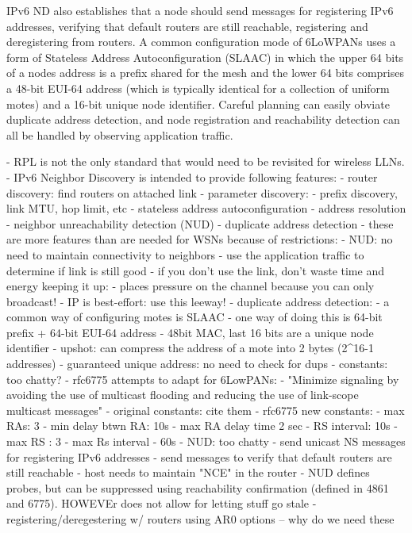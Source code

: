 IPv6 ND also establishes that a node should send messages for registering IPv6 addresses, verifying that default routers are still reachable, registering and deregistering from routers.
A common configuration mode of 6LoWPANs uses a form of Stateless Address Autoconfiguration (SLAAC) in which the upper 64 bits of a nodes address is a prefix shared for the mesh and the lower 64 bits comprises a 48-bit EUI-64 address (which is typically identical for a collection of uniform motes) and a 16-bit unique node identifier.
Careful planning can easily obviate duplicate address detection, and node registration and reachability detection can all be handled by observing application traffic.



- RPL is not the only standard that would need to be revisited for wireless LLNs.
- IPv6 Neighbor Discovery is intended to provide following features:
    - router discovery: find routers on attached link
    - parameter discovery:
        - prefix discovery, link MTU, hop limit, etc
    - stateless address autoconfiguration
    - address resolution
    - neighbor unreachability detection (NUD)
    - duplicate address detection
- these are more features than are needed for WSNs because of restrictions:
    - NUD: no need to maintain connectivity to neighbors
        - use the application traffic to determine if link is still good
        - if you don't use the link, don't waste time and energy keeping it up:
            - places pressure on the channel because you can only broadcast!
        - IP is best-effort: use this leeway!
    - duplicate address detection:
        - a common way of configuring motes is SLAAC
        - one way of doing this is 64-bit prefix + 64-bit EUI-64 address
        - 48bit MAC, last 16 bits are a unique node identifier
        - upshot: can compress the address of a mote into 2 bytes (2^16-1 addresses)
        - guaranteed unique address: no need to check for dups
- constants: too chatty?
    - rfc6775 attempts to adapt for 6LowPANs:
    - "Minimize signaling by avoiding the use of multicast
      flooding and reducing the use of link-scope multicast messages"
    - original constants: cite them
    - rfc6775 new constants:
        - max RAs: 3
        - min delay btwn RA: 10s
        - max RA delay time 2 sec
        - RS interval: 10s
        - max RS : 3
        - max Rs interval - 60s
- NUD: too chatty
    - send unicast NS messages for registering IPv6 addresses
    - send messages to verify that default routers are still reachable
    - host needs to maintain "NCE" in the router
    - NUD defines probes, but can be suppressed using reachability confirmation
      (defined in 4861 and 6775). HOWEVEr does not allow for letting stuff go stale
    - registering/deregestering w/ routers using AR0 options -- why do we need these
\fi
